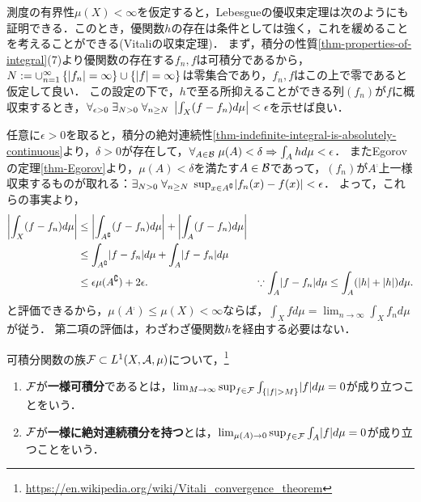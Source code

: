 \documentclass[uplatex, dvipdfmx]{jsreport}
\begin{document}
\begin{discussion}[Lebesgueの優収束定理の再検討]
    測度の有界性$\mu(X)<\infty$を仮定すると，Lebesgueの優収束定理は次のようにも証明できる．このとき，優関数$h$の存在は条件としては強く，これを緩めることを考えることができる(Vitaliの収束定理)．
    まず，積分の性質\ref{thm-properties-of-integral}(7)より優関数の存在する$f_n,f$は可積分であるから，$N:=\cup^\infty_{n=1}\left\{\lvert f_n\rvert=\infty\right\}\cup\{\lvert f\rvert=\infty\}$は零集合であり，$f_n,f$はこの上で零であると仮定して良い．
    この設定の下で，$h$で至る所抑えることができる列$(f_n)$が$f$に概収束するとき，$\forall_{\epsilon>0}\;\exists_{N>0}\;\forall_{n\ge N}\;\left|\int_X(f-f_n)d\mu\right|<\epsilon$を示せば良い．

    任意に$\epsilon>0$を取ると，積分の絶対連続性\ref{thm-indefinite-integral-is-absolutely-continuous}より，$\delta>0$が存在して，$\forall_{A\in\mathcal{B}}\;\mu(A)<\delta\Rightarrow\int_Ahd\mu<\epsilon$．
    またEgorovの定理\ref{thm-Egorov}より，$\mu(A)<\delta$を満たす$A\in\mathcal{B}$であって，$(f_n)$が$A^\comp$上一様収束するものが取れる：$\exists_{N>0}\;\forall_{n\ge N}\;\sup_{x\in A^\complement}\lvert f_n(x)-f(x)\rvert<\epsilon$．
    よって，これらの事実より，
    \begin{align*}
        \left|\int_X(f-f_n)d\mu\right|&\le\left|\int_{A^\complement}(f-f_n)d\mu\right|+\left|\int_A(f-f_n)d\mu\right|\\
        &\le\int_{A^\complement}\lvert f-f_n\rvert d\mu+\int_A\lvert f-f_n\rvert d\mu\\
        &\le\epsilon\mu(A^\complement)+2\epsilon.&\because \int_A\lvert f-f_n\rvert d\mu\le\int_A(\lvert h\rvert+\lvert h\rvert)d\mu.
    \end{align*}
    と評価できるから，$\mu(A^\comp)\le\mu(X)<\infty$ならば，$\int_Xfd\mu=\lim_{n\to\infty}\int_Xf_nd\mu$が従う．
    第二項の評価は，わざわざ優関数$h$を経由する必要はない．
\end{discussion}

\begin{definition}
    可積分関数の族$\mathcal{F}\subset L^1(X,\mathcal{A},\mu)$について，\footnote{\url{https://en.wikipedia.org/wiki/Vitali_convergence_theorem}}
    \begin{enumerate}
        \item $\mathcal{F}$が\textbf{一様可積分}であるとは，$\lim_{M\to\infty}\sup_{f\in\mathcal{F}}\int_{\left\{\lvert f\rvert>M\right\}}\lvert f\rvert d\mu=0$が成り立つことをいう．
        \item $\mathcal{F}$が\textbf{一様に絶対連続積分を持つ}とは，$\lim_{\mu(A)\to 0}\sup_{f\in\mathcal{F}}\int_A\lvert f\rvert d\mu=0$が成り立つことをいう．
    \end{enumerate}
\end{definition}
\end{document}
